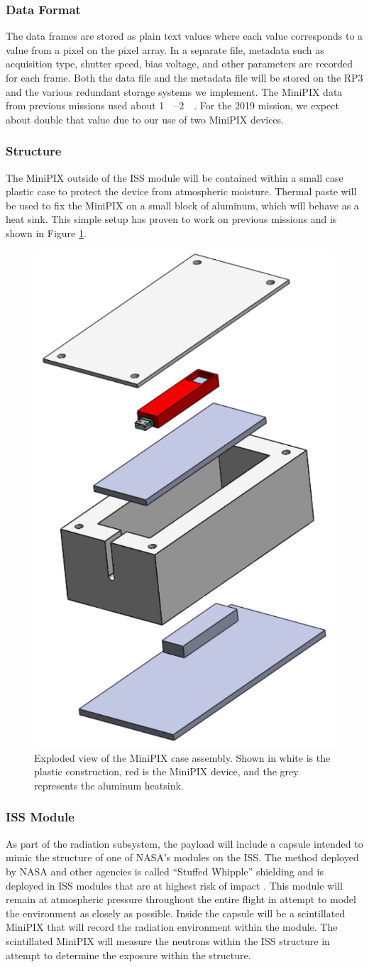{\subsubsection{Data Format}
The data frames are stored as plain text values where each value corresponds to a value from a pixel on the pixel array. In a separate file, metadata such as acquisition type, shutter speed, bias voltage, and other parameters are recorded for each frame. Both the data file and the metadata file will be stored on the RP\num{3} and the various redundant storage systems we implement. The MiniPIX data from previous missions used about \SIrange{1}{2}{\giga\byte}. For the 2019 mission, we expect about double that value due to our use of two MiniPIX devices.

\subsubsection{Structure}
The MiniPIX outside of the ISS module will be contained within a small case plastic case to protect the device from atmospheric moisture. Thermal paste will be used to fix the MiniPIX on a small block of aluminum, which will behave as a heat sink. This simple setup has proven to work on previous missions and is shown in Figure \ref{fig:CaseAssembly}.
\begin{figure}[h]
    \includegraphics[scale=1, width=.25\textwidth]{Figures/MinipixCaseAssembly.pdf}
    \caption{Exploded view of the MiniPIX case assembly. Shown in white is the plastic construction, red is the MiniPIX device, and the grey represents the aluminum heatsink.}
    \label{fig:CaseAssembly}
\end{figure}

\subsubsection{ISS Module}
\label{subsec:ISSModule}
As part of the radiation subsystem, the payload will include a capsule intended to mimic the structure of one of NASA's modules on the ISS.
The method deployed by NASA and other agencies is called ``Stuffed Whipple'' shielding and is deployed in ISS modules that are at highest risk of impact \cite{NASAShielding}.
This module will remain at atmospheric pressure throughout the entire flight in attempt to model the environment as closely as possible.
Inside the capsule will be a scintillated MiniPIX that will record the radiation environment within the module.
The scintillated MiniPIX will measure the neutrons within the ISS structure in attempt to determine the exposure within the structure.

}
